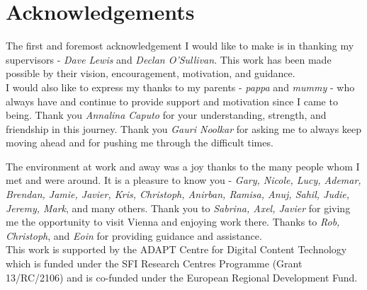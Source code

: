 \chapter*{Acknowledgements}

The first and foremost acknowledgement I would like to make is in thanking my supervisors - \textit{Dave Lewis} and \textit{Declan O'Sullivan}. This work has been made possible by their vision, encouragement, motivation, and guidance. \\ [10mm]

I would also like to express my thanks to my parents - \textit{pappa} and \textit{mummy} - who always have and continue to provide support and motivation since I came to being.
Thank you \textit{Annalina Caputo} for your understanding, strength, and friendship in this journey.
Thank you \textit{Gauri Noolkar} for asking me to always keep moving ahead and for pushing me through the difficult times.

The environment at work and away was a joy thanks to the many people whom I met and were around. It is a pleasure to know you - \textit{Gary, Nicole, Lucy, Ademar, Brendan, Jamie, Javier, Kris, Christoph, Anirban, Ramisa, Anuj, Sahil, Judie, Jeremy, Mark}, and many others. Thank you to \textit{Sabrina, Axel, Javier} for giving me the opportunity to visit Vienna and enjoying work there. Thanks to \textit{Rob, Christoph}, and \textit{Eoin} for providing guidance and assistance. \\[10mm]

This work is supported by the ADAPT Centre for Digital Content Technology which is funded under the SFI Research Centres Programme (Grant 13/RC/2106) and is co-funded under the European Regional Development Fund.
